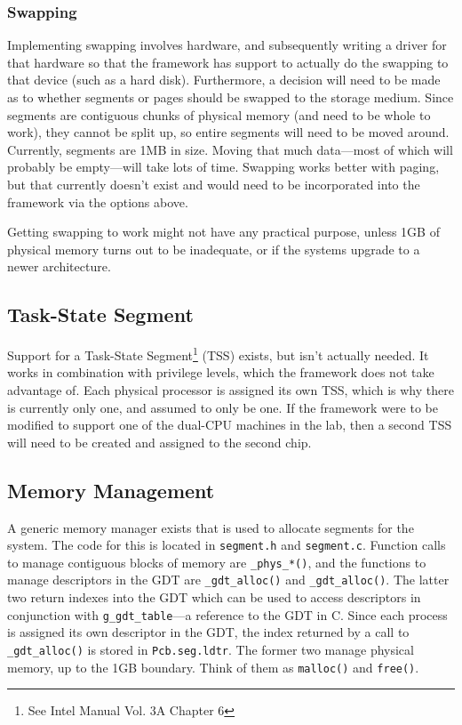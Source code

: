 \documentclass[titlepage]{article}
\begin{document}
\subsubsection{Swapping}

Implementing swapping involves hardware, and subsequently writing a driver for
that hardware so that the framework has support to actually do the swapping to
that device (such as a hard disk). Furthermore, a decision will need to be made
as to whether segments or pages should be swapped to the storage medium.  Since
segments are contiguous chunks of physical memory (and need to be whole to
work), they cannot be split up, so entire segments will need to be moved around.
Currently, segments are 1MB in size. Moving that much data---most of which will
probably be empty---will take lots of time. Swapping works better with paging,
but that currently doesn't exist and would need to be incorporated into the
framework via the options above.

Getting swapping to work might not have any practical purpose, unless 1GB of
physical memory turns out to be inadequate, or if the systems upgrade to a newer
architecture.

\subsection{Task-State Segment}

Support for a Task-State Segment\footnote{See Intel Manual Vol. 3A Chapter 6}
(TSS) exists, but isn't actually needed. It works in combination with privilege
levels, which the framework does not take advantage of. Each physical processor
is assigned its own TSS, which is why there is currently only one, and assumed
to only be one. If the framework were to be modified to support one of the
dual-CPU machines in the lab, then a second TSS will need to be created and
assigned to the second chip.

\subsection{Memory Management}

A generic memory manager exists that is used to allocate segments for the
system. The code for this is located in \verb|segment.h| and \verb|segment.c|.
Function calls to manage contiguous blocks of memory are \verb|_phys_*()|, and
the functions to manage descriptors in the GDT are \verb|_gdt_alloc()| and
\verb|_gdt_alloc()|. The latter two return indexes into the GDT which can be
used to access descriptors in conjunction with \verb|g_gdt_table|---a reference
to the GDT in C. Since each process is assigned its own descriptor in the GDT,
the index returned by a call to \verb|_gdt_alloc()| is stored in
\verb|Pcb.seg.ldtr|. The former two manage physical memory, up to the 1GB
boundary. Think of them as \verb|malloc()| and \verb|free()|.
\end{document}
